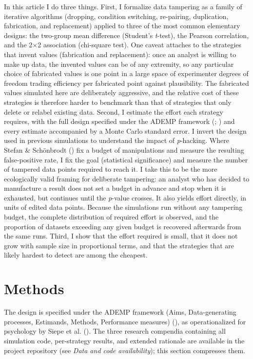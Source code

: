 \documentclass[
  nonatbib,
  authoryear,
  preprint]{elsarticle}
\begin{document}
In this article I do three things. First, I formalize data tampering as
a family of iterative algorithms (dropping, condition switching,
re-pairing, duplication, fabrication, and replacement) applied to three
of the most common elementary designs: the two-group mean difference
(Student's \emph{t}-test), the Pearson correlation, and the 2×2
association (chi-square test). One caveat attaches to the strategies
that invent values (fabrication and replacement): once an analyst is
willing to make up data, the invented values can be of any extremity, so
any particular choice of fabricated values is one point in a large space
of experimenter degrees of freedom trading efficiency per fabricated
point against plausibility. The fabricated values simulated here are
deliberately aggressive, and the relative cost of these strategies is
therefore harder to benchmark than that of strategies that only delete
or relabel existing data. Second, I estimate the effort each strategy
requires, with the full design specified under the ADEMP framework
(;
) and every
estimate accompanied by a Monte Carlo standard error. I invert the
design used in previous simulations to understand the impact of
\emph{p}-hacking. Where Stefan \& Schönbrodt
() fix a budget of manipulations and
measure the resulting false-positive rate, I fix the goal (statistical
significance) and measure the number of tampered data points required to
reach it. I take this to be the more ecologically valid framing for
deliberate tampering: an analyst who has decided to manufacture a result
does not set a budget in advance and stop when it is exhausted, but
continues until the \emph{p}-value crosses. It also yields effort
directly, in units of edited data points. Because the simulations run
without any tampering budget, the complete distribution of required
effort is observed, and the proportion of datasets exceeding any given
budget is recovered afterwards from the same runs. Third, I show that
the effort required is small, that it does not grow with sample size in
proportional terms, and that the strategies that are likely hardest to
detect are among the cheapest.

\section{Methods}\label{methods}

The design is specified under the ADEMP framework (Aims, Data-generating
processes, Estimands, Methods, Performance measures)
(), as
operationalized for psychology by Siepe et al.
(). The three research
compendia containing all simulation code, per-strategy results, and
extended rationale are available in the project repository (see
\emph{Data and code availability}); this section compresses them.
\end{document}
